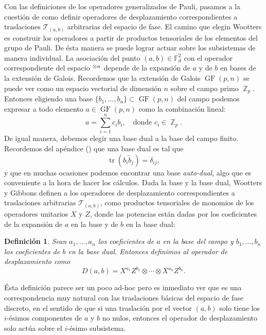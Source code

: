 \documentclass[a4paper]{report}
\DeclareMathOperator{\Z}{\mathbb{Z}}
\let\H\relax
\DeclareMathOperator{\H}{\mathcal H}
\DeclareMathOperator{\tr}{tr}
\DeclareMathOperator{\GF}{GF}
\newtheorem{definition}{Definición}
\begin{document}
  Con las definiciones de los operadores generalizados de
  Pauli, pasamos a la cuestión de como definir operadores de
  desplazamiento correspondientes a traslaciones $\mathcal
  T_{(a,b)}$ arbitrarias del espacio de fase. El camino que
  elegin Wootters es construir los operadores a
  partir de productos tensoriales de los elementos del grupo
  de Pauli. De ésta manera se puede lograr actuar sobre los
  subsistemas de manera individual. La asociación del punto
  $(a,b) \in \mathbb F_d^2$ con el operador correspondiente
  del espacio $\H^{\otimes n}$ depende de la expansión de
  $a$ y de $b$ en bases de la extensión de Galois.
  Recordemos que la extensión de Galois $\GF(p,n)$ se puede
  ver como un espacio vectorial de dimensión $n$ sobre el
  campo primo $\Z_p$. Entonces eligiendo una base
  $\{b_1,\ldots,b_n\} \subset \GF(p,n)$ del campo podemos
  expresar a todo elemento $a \in \GF(p,n)$ como la
  combinación lineal:
  \[
    a = \sum_{i=1}^{n} c_i b_i,
    \quad
    \text{donde } c_i \in \Z_p.
  \] 
  De igual manera, debemos elegir una base dual a la base
  del campo finito. Recordemos del apéndice () que una base
  dual es tal que
  \[
    \tr(b_i \tilde b_j) = \delta_{ij},
  \] 
  y que en muchas ocasiones podemos encontrar una base
  \textit{auto-dual}, algo que es conveniente a la hora de
  hacer los cálculos. Dada la base y la base dual, Wootters
  y Gibbons definen a los operadores de desplazamiento
  correspondientes a traslaciones arbitrarias $\mathcal
  T_{(a,b)}$, como productos tensoriales de monomios de los
  operadores unitarios $X$ y $Z$, donde las potencias están
  dadas por los coeficientes de la expansión de $a$ en la
  base y de $b$ en la base dual:
  \begin{definition}
    Sean $a_1,\ldots,a_n$ los coeficientes de $a$ en la base
    del campo y $b_1,\ldots,b_n$ los coeficientes de $b$ en
    la base dual. Entonces definimos al operador de
    desplazamiento como
    \begin{equation}
      D(a,b)
      = X^{a_1} Z^{b_1} \otimes \cdots \otimes X^{a_n}
      Z^{b_n}.
    \end{equation}
  \end{definition}
  Ésta definición parece ser un poco ad-hoc pero es
  inmediato ver que es una correspondencia muy natural con
  las traslaciones básicas del espacio de fase discreto,
  en el sentido de que si una traslación por el vector
  $(a,b)$ solo tiene los $i$-ésimos componentes de $a$ y $b$
  no nulos, entonces el operador de desplazamiento solo
  actúa sobre el $i$-ésimo subsistema.
\end{document}

